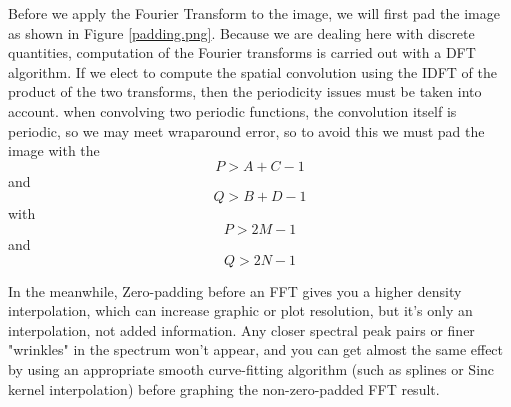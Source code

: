 \documentclass[
	12pt, %
]{style/fphw}
\begin{document}
Before we apply the Fourier Transform to the image, we will first pad the image as shown in Figure \ref{padding.png}. Because we are dealing here with discrete quantities, computation of the Fourier transforms is carried out with a DFT algorithm. If we elect to compute the spatial convolution using the IDFT of the product of the two transforms, then the periodicity issues must be taken into account. when convolving two periodic functions, the convolution itself is periodic, so we may meet wraparound error, so to avoid this we must pad the image with the $$P > A + C - 1$$ and $$Q > B + D - 1$$ with $$P > 2M - 1$$ and $$Q > 2N - 1$$

In the meanwhile, Zero-padding before an FFT gives you a higher density interpolation, which can increase graphic or plot resolution, but it's only an interpolation, not added information. Any closer spectral peak pairs or finer "wrinkles" in the spectrum won't appear, and you can get almost the same effect by using an appropriate smooth curve-fitting algorithm (such as splines or Sinc kernel interpolation) before graphing the non-zero-padded FFT result.
\end{document}
